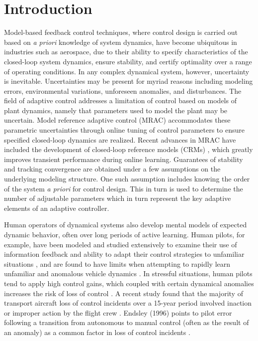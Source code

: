 \chapter{Introduction} \label{ch:introduction}

Model-based feedback control techniques, where control design is carried out based on \textit{a priori} knowledge of system dynamics, have become ubiquitous in industries such as aerospace, due to their ability to specify characteristics of the closed-loop system dynamics, ensure stability, and certify optimality over a range of operating conditions. In any complex dynamical system, however, uncertainty is inevitable. Uncertainties may be present for myriad reasons including modeling errors, environmental variations, unforeseen anomalies, and disturbances. The field of adaptive control addresses a limitation of control based on models of plant dynamics, namely that parameters used to model the plant may be uncertain. Model reference adaptive control (MRAC) \cite{narendra2012stable, lavretsky2013robust} accommodates these parametric uncertainties through online tuning of control parameters to ensure specified closed-loop dynamics are realized. Recent advances in MRAC have included the development of closed-loop reference models (CRMs) \cite{gibson2013adaptive}, which greatly improves transient performance during online learning. Guarantees of stability and tracking convergence are obtained under a few assumptions on the underlying modeling structure. One such assumption includes knowing the order of the system \textit{a priori} for control design. This in turn is used to determine the number of adjustable parameters which in turn represent the key adaptive elements of an adaptive controller.

Human operators of dynamical systems also develop mental models of expected dynamic behavior, often over long periods of active learning. Human pilots, for example, have been modeled and studied extensively to examine their use of information feedback and ability to adapt their control strategies to unfamiliar situations \cite{mcruer1967review, phatak1969model}, and are found to have limits when attempting to rapidly learn unfamiliar and anomalous vehicle dynamics \cite{hess2012modeling, hess2015modeling, endsley1995toward, zaal2016manual, oliver2017cognition}. In stressful situations, human pilots tend to apply high control gains, which coupled with certain dynamical anomalies increases the risk of loss of control \cite{hess1997unified}. A recent study found that the majority of transport aircraft loss of control incidents over a 15-year period involved inaction or improper action by the flight crew \cite{belcastro2014preliminary} . Endsley (1996) points to pilot error following a transition from autonomous to manual control (often as the result of an anomaly) as a common factor in loss of control incidents \cite{endsley1996automation}. 


